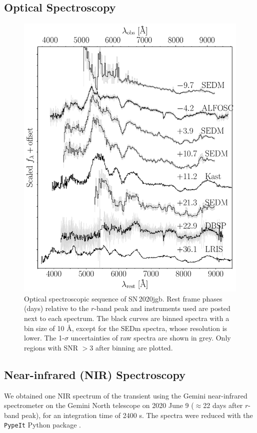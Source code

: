 \documentclass[twocolumn]{aastex631}
\newcommand\sn{SN\,2020jgb}
\begin{document}
\subsection{Optical Spectroscopy}

\begin{figure}
    \centering
    \includegraphics[width=\linewidth]{optical_spec_evolution.pdf}
    \caption{Optical spectroscopic sequence of \sn. Rest frame phases (days) relative to the $r$-band peak and instruments used are posted next to each spectrum. The black curves are binned spectra with a bin size of 10 \r{A}, except for the SEDm spectra, whose resolution is lower. The 1-$\sigma$ uncertainties of raw spectra are shown in grey. Only regions with SNR $>3$ after binning are plotted.} %
    \label{fig:spec_evo}
\end{figure}

\subsection{Near-infrared (NIR) Spectroscopy}
We obtained one NIR spectrum of the transient using the Gemini near-infrared spectrometer \citep[GNIRS;][]{GNIRS1998} on the Gemini North telescope on 2020 June 9 ($\approx$22 days after $r$-band peak), for an integration time of 2400 s. The spectra were reduced with the \texttt{PypeIt} Python package \citep{pypeit:joss_pub,pypeit:zenodo}.
\end{document}
